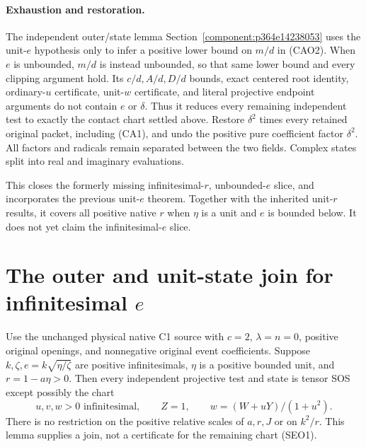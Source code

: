\paragraph{Exhaustion and restoration.}
The independent outer/state lemma Section~\ref{component:p364e14238053}
uses the unit-$e$ hypothesis only to infer a positive lower bound on
$m/d$ in (CAO2). When $e$ is unbounded, $m/d$ is instead unbounded,
so that same lower bound and every clipping argument hold. Its
$c/d,A/d,D/d$ bounds, exact centered root identity, ordinary-$u$
certificate, unit-$w$ certificate, and literal projective endpoint
arguments do not contain $e$ or $\delta$. Thus it reduces every
remaining independent test to exactly the contact chart settled above.
Restore $\delta^2$ times every retained original packet, including
(CA1), and undo the positive pure coefficient factor $\delta^2$.
All factors and radicals remain separated between the two fields.
Complex states split into real and imaginary evaluations.

This closes the formerly missing infinitesimal-$r$, unbounded-$e$
slice, and incorporates the previous unit-$e$ theorem. Together with
the inherited unit-$r$ results, it covers all positive native $r$
when $\eta$ is a unit and $e$ is bounded below. It does not yet
claim the infinitesimal-$e$ slice.


\section{\texorpdfstring{The outer and unit-state join for infinitesimal $e$}{The outer and unit-state join for infinitesimal e}}
\label{component:p05a86be0046c}

\label{p05a86be0046c:sec:small-e-outer}

\begin{lemma}
Use the unchanged physical native C1 source with $c=2$,
$\lambda=n=0$, positive original openings, and nonnegative original
event coefficients. Suppose $k,\zeta,e=k\sqrt{\eta/\zeta}$ are positive
infinitesimals, $\eta$ is a positive bounded unit, and
$r=1-a\eta>0$. Then every independent projective test and state is
tensor SOS except possibly the chart
\[
 u,v,w>0\text{ infinitesimal},\qquad Z=1,
 \qquad w=(W+uY)/(1+u^2).
 \tag{SEO1}
\]
There is no restriction on the positive relative scales of $a,r,J$
or on $k^2/r$. This lemma supplies a join, not a certificate for the
remaining chart (SEO1).
\end{lemma}

